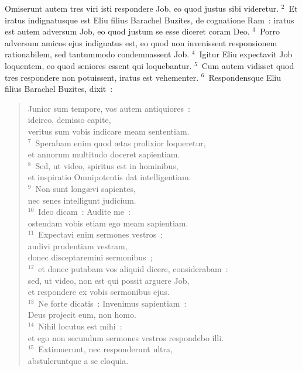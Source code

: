 \lettrine[lines=3,image=true,loversize=0.05,lraise=-0.03]{O}{}miserunt autem tres viri isti respondere Job, eo quod justus sibi videretur.
${}^{2}$~Et iratus indignatusque est Eliu filius Barachel Buzites, de cognatione Ram~: iratus est autem adversum Job, eo quod justum se esse diceret coram Deo.
${}^{3}$~Porro adversum amicos ejus indignatus est, eo quod non invenissent responsionem rationabilem, sed tantummodo condemnassent Job.
${}^{4}$~Igitur Eliu expectavit Job loquentem, eo quod seniores essent qui loquebantur.
${}^{5}$~Cum autem vidisset quod tres respondere non potuissent, iratus est vehementer.
${}^{6}$~Respondensque Eliu filius Barachel Buzites, dixit~: \begin{flushleft}\begin{verse}Junior sum tempore, vos autem antiquiores~:\\ idcirco, demisso capite,\\ veritus sum vobis indicare meam sententiam.\\
${}^{7}$~Sperabam enim quod \ae tas prolixior loqueretur,\\ et annorum multitudo doceret sapientiam.\\
${}^{8}$~Sed, ut video, spiritus est in hominibus,\\ et inspiratio Omnipotentis dat intelligentiam.\\
${}^{9}$~Non sunt long\ae vi sapientes,\\ nec senes intelligunt judicium.\\
${}^{10}$~Ideo dicam~: Audite me~:\\ ostendam vobis etiam ego meam sapientiam.\\
${}^{11}$~Expectavi enim sermones vestros~;\\ audivi prudentiam vestram,\\ donec disceptaremini sermonibus~;\\
${}^{12}$~et donec putabam vos aliquid dicere, considerabam~:\\ sed, ut video, non est qui possit arguere Job,\\ et respondere ex vobis sermonibus ejus.\\
${}^{13}$~Ne forte dicatis~: Invenimus sapientiam~:\\ Deus projecit eum, non homo.\\
${}^{14}$~Nihil locutus est mihi~:\\ et ego non secundum sermones vestros respondebo illi.\\
${}^{15}$~Extimuerunt, nec responderunt ultra,\\ abstuleruntque a se eloquia.\\

\end{verse}
\end{flushleft}
